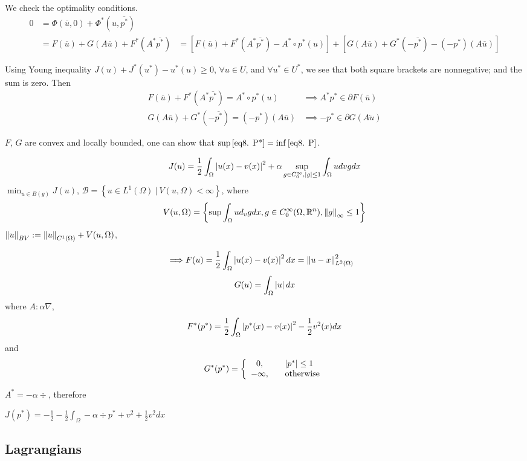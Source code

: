 We check the optimality conditions.
\begin{align*}
	0&=\Phi (\overline{u},0)+\Phi^*(u, \overline{p^*}) \\
	&= F(\overline{u})+G(A\overline{u})+F^*(A^*\overline{p^*})
	&= [F(\overline{u})+F^*(A^*\overline{p^*})-A^*\circ p^*(u)]+[G(A\overline{u})+G^*(-\overline{p^*})-(-p^*)(A\overline{u})]
\end{align*}

Using Young inequality $J(u)+J^*(u^*)-u^*(u)\geq 0$, $\forall u \in U$, and $\forall u^* \in U^*$, we see that both square brackets are nonnegative; and the sum is zero. Then
\begin{align*}
	F(\overline{u})+F^*(A^*\overline{p^*})=A^*\circ p^*(u) &\implies A^*p^* \in \partial F(\overline{u}) \\
	G(A\overline{u})+G^*(-\overline{p^*})=(-p^*)(A\overline{u}) &\implies -p^* \in \partial G(A\overleftarrow{u})
\end{align*}

$F$, $G$ are convex and locally bounded, one can show that 
$\sup\eqref{eq8. P*}=\inf\eqref{eq8. P}$.
\begin{example}
	\begin{equation}
		J(u)=\frac{1}{2} \int_{\Omega}\left|u(x)-v(x)\right|^2+\alpha \sup_{g\in C_0^\infty, \left|g\right|\leq 1} \int_{\Omega} u dv g dx
	\end{equation}
	$\min_{u\in B(g)} J(u)$, $\mathcal{B}=\left\lbrace u\in L^1(\Omega) \ | \ V(u, \Omega) < \infty\right\rbrace$, where
	\begin{equation}
		V(u, \Omega)=\left\lbrace 
		\sup \int_{\Omega} u d_v g dx, g \in C_0^\infty (\Omega, \mathbb{R}^n), \left\lVert g\right\rVert_\infty \leq 1
		\right\rbrace
	\end{equation}
	$\left\lVert u\right\rVert_{BV}:= \left\lVert u\right\rVert_{C^1(\Omega)}+V(u, \Omega)$,
	
	\begin{align*}
		\implies & F(u)=\frac{1}{2}\int_{\Omega} \left|u(x)-v(x)\right|^2 dx = \left\lVert u-x\right\rVert_{L^2(\Omega)}^2
	\end{align*}
	\[G(u)=\int_{\Omega} \left|u\right|dx\]
	 where $A: \alpha \nabla$,
	\begin{align*}
		F^*(p^*)=\frac{1}{2} \int_{\Omega}\left|p^*(x)-v(x)\right| ^2 -\frac{1}{2} v^2(x) dx
	\end{align*}
	and 
	\[G^*(p^*) =\left\lbrace 
	\begin{array}{cl}
		0, &\quad \left|p^*\right| \leq 1 \\
	-\infty, &\quad \text{otherwise}
	\end{array}
	\right. \]
	
	$A^*=-\alpha \div$, therefore
	
	$J(p^*)=-\frac{1}{2} -\frac{1}{2} \int_{\Omega} -\alpha \div p^* + v^2+ \frac{1}{2} v^2 dx$
\end{example}

\subsection{Lagrangians}